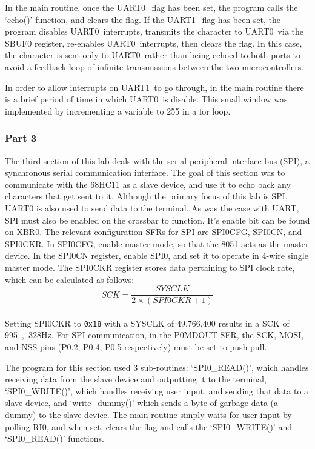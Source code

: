 \documentclass[12pt]{article}
\newcommand{\uz}{UART0}
\newcommand{\uo}{UART1}
\begin{document}
In the main routine, once the \uz\_flag has been set, the program calls the `echo()' function, and clears the flag. If the \uo\_flag has been set, the program disables \uz\ interrupts, transmits the character to \uz\ via the SBUF0 register, re-enables \uz\ interrupts, then clears the flag. In this case, the character is sent only to \uz\ rather than being echoed to both ports to avoid a feedback loop of infinite transmissions between the two microcontrollers.

In order to allow interrupts on \uo\ to go through, in the main routine there is a brief period of time in which \uz\ is disable. This small window was implemented by incrementing a variable to 255 in a for loop.


\subsubsection{Part 3}
The third section of this lab deals with the serial peripheral interface bus (SPI), a synchronous serial communication interface. The goal of this section was to communicate with the 68HC11 as a slave device, and use it to echo back any characters that get sent to it. Although the primary focus of this lab is SPI, UART0 is also used to send data to the terminal. As was the case with UART, SPI must also be enabled on the crossbar to function. It's enable bit can be found on XBR0. The relevant configuration SFRs for SPI are SPI0CFG, SPI0CN, and SPI0CKR. In SPI0CFG, enable master mode, so that the 8051 acts as the master device. In the SPI0CN register, enable SPI0, and set it to operate in 4-wire single master mode. The SPI0CKR register stores data pertaining to SPI clock rate, which can be calculated as follows:\\
\begin{equation}
SCK = \frac{SYSCLK}{2\times(SPI0CKR+1)}
\end{equation}\\
Setting SPI0CKR to \texttt{0x18} with a SYSCLK of 49,766,400 results in a SCK of \si{995,328}{Hz}. For SPI communication, in the P0MDOUT SFR, the SCK, MOSI, and NSS pins (P0.2, P0.4, P0.5 respectively) must be set to push-pull.

The program for this section used 3 sub-routines: `SPI0\_READ()', which handles receiving data from the slave device and outputting it to the terminal, `SPI0\_WRITE()', which handles receiving user input, and sending that data to a slave device, and `write\_dummy()' which sends a byte of garbage data (a dummy) to the slave device. The main routine simply waits for user input by polling RI0, and when set, clears the flag and calls the  `SPI0\_WRITE()' and `SPI0\_READ()' functions.
\end{document}
